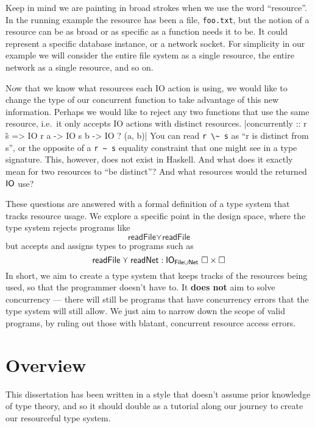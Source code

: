 \documentclass{report}
\begin{document}
Keep in mind we are painting in broad strokes when we use the word
``resource''. In the running example the resource has been a file,
\texttt{foo.txt}, but the notion of a resource can be as broad or as specific as
a function needs it to be. It could represent a specific database
instance, or a network socket. For simplicity in our example we will
consider the entire file system as a single resource, the entire network as
a single resource, and so on.

Now that we know what resources each IO action is using, we would like to change
the type of our concurrent function to take advantage of this new
information. Perhaps we would like to reject any two functions that use the same
resource, i.e.\ it only accepts IO actions with distinct resources.
|concurrently :: r \~ s => IO r a -> IO s b -> IO ? (a, b)|
You can read \verb$r \~ s$ as ``r is distinct from s'', or the opposite of a
\verb$r ~ s$ equality constraint that one might see in a type signature. This,
however, does not exist in Haskell.  And what does it exactly mean for two
resources to ``be distinct''? And what resources would the returned $\mathsf{IO}$ use?

These questions are answered with a
formal definition of a type system that tracks resource usage. We explore a
specific point in the design space, where the type system rejects programs like
\[ \textsf{readFile} \curlyvee \textsf{readFile} \]
but accepts and assigns types to programs such as
\[ \textsf{readFile} \curlyvee \textsf{readNet} : \mathsf{IO}_{\textsf{File} \cup \textsf{Net}} \
  \square \times \square \]
In short, we aim to create a type system that keeps tracks of the resources
being used, so that the programmer doesn't have to. It \textbf{does not} aim to
solve concurrency --- there will still be programs that have concurrency errors
that the type system will still allow. We just aim to narrow down the scope of
valid programs, by ruling out those with blatant, concurrent resource access
errors. 

\section{Overview}
This dissertation has been written in a style that doesn't assume prior
knowledge of type theory, and so it should double as a tutorial along our
journey to create our resourceful type system.
\end{document}
